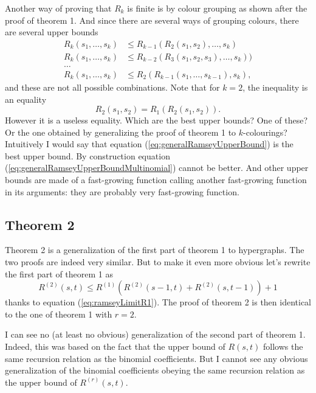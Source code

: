 \medskip

Another way of proving that $R_k$ is finite is by colour grouping as shown after the proof of theorem 1.
And since there are several ways of grouping colours, there are several upper bounds
\begin{align}
    R_k(s_1,\dots,s_k) & \leq R_{k-1}(R_2(s_1,s_2),\dots,s_k) \\
    R_k(s_1,\dots,s_k) & \leq R_{k-2}(R_3(s_1,s_2,s_3),\dots,s_k)) \\
    \dots \nonumber \\
    R_k(s_1,\dots,s_k) & \leq R_2(R_{k-1}(s_1,\dots,s_{k-1}),s_k) ,
\end{align}
and these are not all possible combinations.
Note that for $k=2$, the inequality is an equality
\begin{equation}
    R_2(s_1,s_2) = R_1(R_2(s_1,s_2)) .
\end{equation}
However it is a useless equality.
Which are the best upper bounds? One of these? Or the one obtained by generalizing the proof of theorem 1 to $k$-colourings?
Intuitively I would say that equation (\ref{eq:generalRamseyUpperBound}) is the best upper bound.
By construction equation (\ref{eq:generalRamseyUpperBoundMultinomial}) cannot be better.
And other upper bounds are made of a fast-growing function calling another fast-growing function in its arguments:
they are probably very fast-growing function.

\subsection{Theorem 2}

Theorem 2 is a generalization of the first part of theorem 1 to hypergraphs.
The two proofs are indeed very similar.
But to make it even more obvious let's rewrite the first  part of theorem 1 as
\begin{equation}
    R^{(2)}(s,t) \leq R^{(1)}(R^{(2)}(s-1,t)+R^{(2)}(s,t-1))+1
    \nonumber
\end{equation}
thanks to equation (\ref{eq:ramseyLimitR1}).
The proof of theorem 2 is then identical to the one of theorem 1 with $r=2$.

I can see no (at least no obvious) generalization of the second part of theorem 1.
Indeed, this was based on the fact that the upper bound of $R(s,t)$ follows the same recursion relation as the binomial coefficients.
But I cannot see any obvious generalization of the binomial coefficients obeying the same recursion relation as the upper bound of $R^{(r)}(s,t)$.

